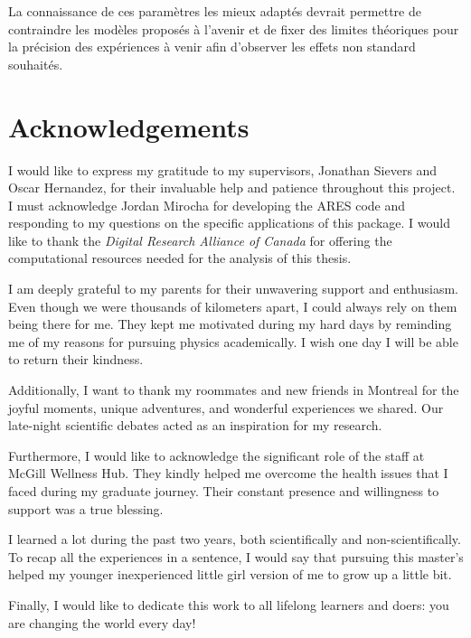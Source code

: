 \documentclass[12pt, TexShade, letterpaper]{report}
\begin{document}
La connaissance de ces paramètres les mieux adaptés devrait permettre de contraindre les modèles proposés à l'avenir et de fixer des limites théoriques pour la précision des expériences à venir afin d'observer les effets non standard souhaités.\par
\chapter*{Acknowledgements}
	\label{chap:acknowledgments}
I would like to express my gratitude to my supervisors, Jonathan Sievers and Oscar Hernandez, for their invaluable help and patience throughout this project. I must acknowledge Jordan Mirocha for developing the ARES code and responding to my questions on the specific applications of this package. I would like to thank the \emph{Digital Research Alliance of Canada} for offering the computational resources needed for the analysis of this thesis.\par
I am deeply grateful to my parents for their unwavering support and enthusiasm. Even though we were thousands of kilometers apart, I could always rely on them being there for me. They kept me motivated during my hard days by reminding me of my reasons for pursuing physics academically. I wish one day I will be able to return their kindness.\par
Additionally, I want to thank my roommates and new friends in Montreal for the joyful moments, unique adventures, and wonderful experiences we shared. Our late-night scientific debates acted as an inspiration for my research. \par
Furthermore, I would like to acknowledge the significant role of the staff at McGill Wellness Hub. They kindly helped me overcome the health issues that I faced during my graduate journey. Their constant presence and willingness to support was a true blessing.\par
I learned a lot during the past two years, both scientifically and non-scientifically. To recap all the experiences in a sentence, I would say that pursuing this master's helped my younger inexperienced little girl version of me to grow up a little bit.\par

 Finally, I would like to dedicate this work to all lifelong learners and doers: you are changing the world every day!
	\tableofcontents\thispagestyle{plain}
 \glsunsetall
	\listoffigures\thispagestyle{plain}
 \glsresetall
 \glsunsetall
	\listoftables
  \glsresetall
	\glsaddall
	\setlength\LTleft{0pt}
	\setlength\LTright{0pt}
	\setlength\glsdescwidth{0.8\hsize}
	\printglossary[title={List of Acronyms}]
\end{document}
